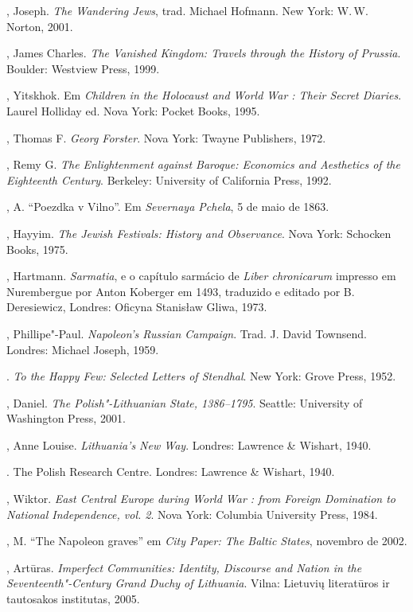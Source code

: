 \begin{bibliohedra}
  , Joseph. \textit{The Wandering Jews}, trad. Michael Hofmann. New
  York: W.\,W. Norton, 2001.

  , James Charles. \textit{The Vanished Kingdom: Travels through the
  History of Prussia}. Boulder: Westview Press, 1999.

  , Yitskhok. Em \textit{Children in the Holocaust and World
  War : Their Secret Diaries}. Laurel Holliday ed. Nova York: Pocket
  Books, 1995.

  , Thomas F. \textit{Georg Forster}. Nova York: Twayne Publishers,
  1972.

  , Remy G. \textit{The Enlightenment against Baroque: Economics
  and Aesthetics of the Eighteenth Century}. Berkeley: University of
  California Press, 1992.

  , A. ``Poezdka v Vilno''. Em \textit{Severnaya Pchela}, 5 de maio de
  1863.

  , Hayyim. \textit{The Jewish Festivals: History and Observance}.
  Nova York: Schocken Books, 1975.

  , Hartmann. \textit{Sarmatia}, e o capítulo sarmácio de
  \textit{Liber chronicarum} impresso em Nurembergue por Anton Koberger em
  1493, traduzido e editado por B. Deresiewicz, Londres: Oficyna
  Stanisław Gliwa, 1973.

  , Phillipe"-Paul. \textit{Napoleon's Russian Campaign}. Trad. J.
  David Townsend. Londres: Michael Joseph, 1959.

  . \textit{To the Happy Few: Selected Letters of Stendhal}. New
  York: Grove Press, 1952.

  , Daniel. \textit{The Polish"-Lithuanian State, 1386--1795}. Seattle:
  University of Washington Press, 2001.

  , Anne Louise. \textit{Lithuania's New Way}. Londres: Lawrence \&
  Wishart, 1940.

  . The Polish Research Centre. Londres:
  Lawrence \& Wishart, 1940.

  , Wiktor. \textit{East Central Europe during World War :
  from Foreign Domination to National Independence, vol. 2}. Nova York:
  Columbia University Press, 1984.

  , M. ``The Napoleon graves'' em \textit{City Paper: The Baltic
  States}, novembro de 2002.

  , Artūras. \textit{Imperfect Communities: Identity, Discourse
  and Nation in the Seventeenth"-Century Grand Duchy of Lithuania}.
  Vilna: Lietuvių literatūros ir tautosakos institutas, 2005.


\end{bibliohedra}
